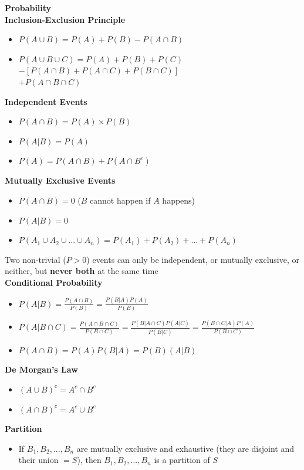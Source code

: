 \documentclass[a4paper, 12pt]{article}
\begin{document}
\begin{multicols*}{3}
{\small\textbf{Probability}} \\
\textbf{Inclusion-Exclusion Principle}
\begin{itemize}
    \item $P(A \cup B) = P(A) + P(B) - P(A \cap B)$
    \item $P(A \cup B \cup C) = P(A) + P(B) + P(C)$
    $- [P(A \cap B) + P(A \cap C) + P(B \cap C)]$ \\
    $+ P(A \cap B \cap C)$
\end{itemize}
\textbf{Independent Events}
\begin{itemize}
    \item $P(A \cap B) = P(A) \times P(B)$
    \item $P(A|B) = P(A)$
    \item $P(A) = P(A \cap B) + P(A \cap B^c)$
\end{itemize}
\textbf{Mutually Exclusive Events}
\begin{itemize}
    \item $P(A \cap B) = 0$ ($B$ cannot happen if $A$ happens)
    \item $P(A|B) = 0$
    \item $P(A_1 \cup A_2 \cup \ldots \cup A_n) = P(A_1) + P(A_2) + \ldots + P(A_n)$
\end{itemize}
Two non-trivial ($P > 0$) events can only be independent, or mutually exclusive, or neither, but \textbf{never both} at the same time \\
\textbf{Conditional Probability}
\begin{itemize}
    \item $P(A|B) = \frac{P(A \cap B)}{P(B)} = \frac{P(B|A)P(A)}{P(B)}$
    \item $P(A|B \cap C) = \frac{P(A \cap B \cap C)}{P(B \cap C)} = \frac{P(B|A \cap C)P(A|C)}{P(B|C)} = \frac{P(B \cap C|A)P(A)}{P(B \cap C)}$
    \item $P(A \cap B) = P(A)P(B|A) = P(B)(A|B)$
\end{itemize}
\textbf{De Morgan's Law}
\begin{itemize}
    \item $(A \cup B)^c = A^c \cap B^c$
    \item $(A \cap B)^c = A^c \cup B^c$
\end{itemize}
\textbf{Partition}
\begin{itemize}
    \item If $B_1, B_2, ..., B_n$ are mutually exclusive and exhaustive (they are disjoint and their union $= S$), then $B_1, B_2, ..., B_n$ is a partition of $S$

\end{itemize}
\end{multicols*}
\end{document}
